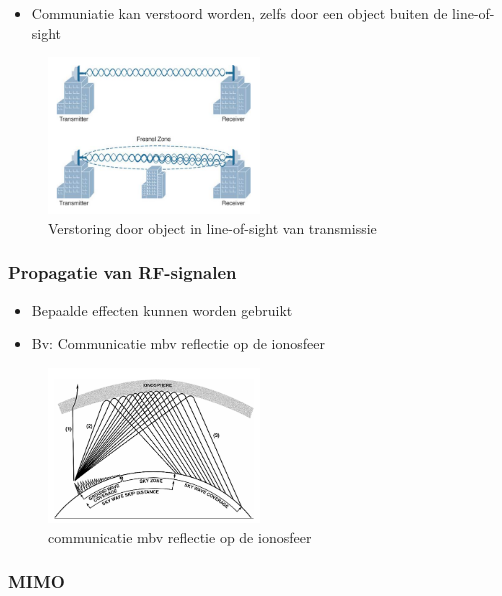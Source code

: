 \documentclass{article}
\begin{document}
\begin{itemize}
    \item Communiatie kan verstoord worden, zelfs door een object buiten de line-of-sight
\end{itemize}

\begin{figure}[H]
    \centering
    \includegraphics[width=0.5\textwidth]{Screenshot_20200309_125331.png}
    \caption{Verstoring door object in line-of-sight van transmissie}
\end{figure}

\subsubsection{Propagatie van RF-signalen}

\begin{itemize}
    \item Bepaalde effecten kunnen worden gebruikt
    \item Bv: Communicatie mbv reflectie op de ionosfeer
\end{itemize}

\begin{figure}[H]
    \centering
    \includegraphics[width=0.5\textwidth]{Screenshot_20200309_125500.png}
    \caption{communicatie mbv reflectie op de ionosfeer}
\end{figure}

\subsubsection{MIMO}
\end{document}
